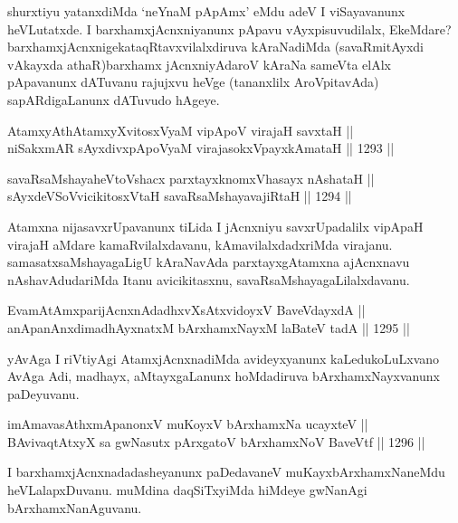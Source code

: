 \begin{artha}
shurxtiyu yatanxdiMda `neYnaM pApAmx' eMdu adeV I viSayavanunx heVLutatxde. I barxhamxjAcnxniyanunx pApavu vAyxpisuvudilalx, EkeMdare? barxhamxjAcnxnigekataqRtavxvilalxdiruva kAraNadiMda (savaRmitAyxdi vAkayxda athaR)barxhamx jAcnxniyAdaroV kAraNa sameVta elAlx pApavanunx dATuvanu rajujxvu heVge (tananxlilx AroVpitavAda) sapARdigaLanunx dATuvudo hAgeye.
\end{artha}

\begin{shl}
AtamxyAthAtamxyXvitosxV\s yaM vipApoV virajaH savxtaH || \\
niSakxmAR sAyxdivxpApoV\s yaM virajasokxV\s payxkAmataH \hfill || 1293 ||  
\end{shl}

\begin{shl}
savaRsaMshayaheVtoVshacx parxtayxknomxVhasayx nAshataH || \\
sAyxdeVSoV\s vicikitosxV\s taH savaRsaMshayavajiRtaH \hfill || 1294 ||  
\end{shl}

\begin{artha}
Atamxna nijasavxrUpavanunx tiLida I jAcnxniyu savxrUpadalilx vipApaH virajaH aMdare kamaRvilalxdavanu, kAmavilalxdadxriMda virajanu. samasatxsaMshayagaLigU kAraNavAda parxtayxgAtamxna ajAcnxnavu nAshavAdudariMda Itanu avicikitasxnu, savaRsaMshayagaLilalxdavanu.
\end{artha}


\begin{shl}
EvamAtAmxparijAcnxnAdadhxvXsAtxvidoyxV BaveVdayxdA || \\
anApanAnxdimadhAyxnatxM bArxhamxNayxM laBateV tadA \hfill || 1295 ||  
\end{shl}

\begin{artha}
yAvAga I riVtiyAgi AtamxjAcnxnadiMda avideyxyanunx kaLedukoLuLxvano AvAga Adi, madhayx, aMtayxgaLanunx hoMdadiruva bArxhamxNayxvanunx paDeyuvanu.
\end{artha}

\begin{shl}
imAmavasAthxmApanonxV muKoyxV bArxhamxNa ucayxteV || \\
BAvivaqtAtxyX sa gwNasutx pArxgatoV bArxhamxNoV BaveVtf \hfill || 1296 ||  
\end{shl}

\begin{artha}
I barxhamxjAcnxnadadasheyanunx paDedavaneV muKayxbArxhamxNaneMdu heVLalapxDuvanu. muMdina daqSiTxyiMda hiMdeye gwNanAgi bArxhamxNanAguvanu.
\end{artha}

